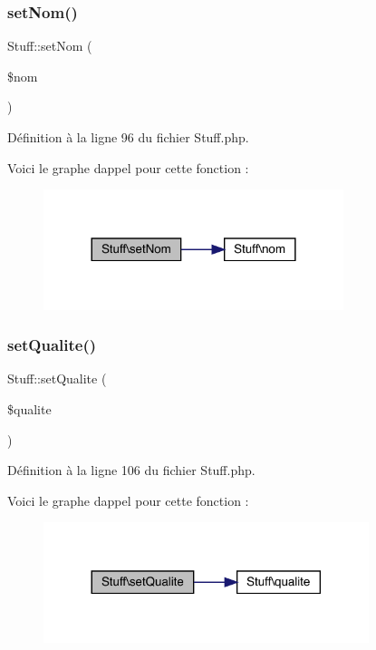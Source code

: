 \subsubsection{\texorpdfstring{set\+Nom()}{setNom()}}
{\footnotesize\ttfamily Stuff\+::set\+Nom (\begin{DoxyParamCaption}\item[{}]{\$nom }\end{DoxyParamCaption})}



Définition à la ligne 96 du fichier Stuff.\+php.

Voici le graphe d\textquotesingle{}appel pour cette fonction \+:\nopagebreak
\begin{figure}[H]
\begin{center}
\leavevmode
\includegraphics[width=248pt]{class_stuff_aa7fef5150533f454fcfed30206a31d45_cgraph}
\end{center}
\end{figure}
\mbox{\label{class_stuff_a7d2dbf87cc016d1131f7dd59210a279c}} 
\subsubsection{\texorpdfstring{set\+Qualite()}{setQualite()}}
{\footnotesize\ttfamily Stuff\+::set\+Qualite (\begin{DoxyParamCaption}\item[{}]{\$qualite }\end{DoxyParamCaption})}



Définition à la ligne 106 du fichier Stuff.\+php.

Voici le graphe d\textquotesingle{}appel pour cette fonction \+:\nopagebreak
\begin{figure}[H]
\begin{center}
\leavevmode
\includegraphics[width=269pt]{class_stuff_a7d2dbf87cc016d1131f7dd59210a279c_cgraph}
\end{center}
\end{figure}
\mbox{\label{class_stuff_ae5e915d228462b653eeb32f277cd86d7}} 
